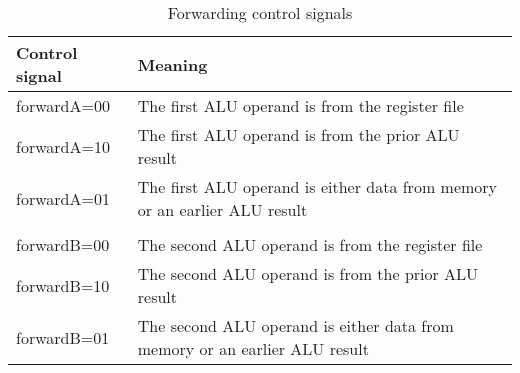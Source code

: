 \begin{table}[H]
    \centering
    \begin{tabular}{| p{2.5cm} p{9cm} |}
    \hline
    Control signal  & Meaning \\ [0.5ex]
    \hline 
    forwardA=00  & The first ALU operand is from the register file\\
    
    forwardA=10  & The first ALU operand is from the prior ALU result\\
    
    forwardA=01  & The first ALU operand is either data from memory or an earlier ALU      result\\
    
    & \\
    forwardB=00  & The second ALU operand is from the register file\\
    forwardB=10  & The second ALU operand is from the prior ALU result \\
    forwardB=01 & The second ALU operand is either data from memory or an earlier ALU result \\
    \hline
    \end{tabular}
    \caption{Forwarding control signals}
    \label{tbl:fpga:forwarding_signals}

\end{table}
